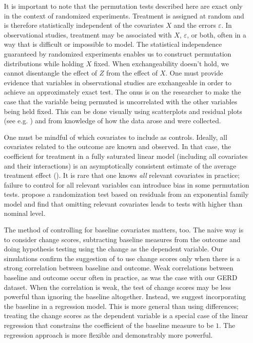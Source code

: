\documentclass[12pt]{article}
\begin{document}
It is important to note that the permutation tests described here are exact only in the context of randomized experiments.
Treatment is assigned at random and is therefore statistically independent of the covariates $X$ and the errors $\varepsilon$.
In observational studies, treatment may be associated with $X$, $\varepsilon$, or both, often in a way that is difficult or impossible to model.
The statistical independence guaranteed by randomized experiments enables us to construct permutation distributions while holding $X$ fixed.
When exchangeability doesn't hold, we cannot disentangle the effect of $Z$ from the effect of $X$.
One must provide evidence that variables in observational studies are exchangeable in order to achieve an approximately exact test.
The onus is on the researcher to make the case that the variable being permuted is uncorrelated with the other variables being held fixed.
This can be done visually using scatterplots and residual plots (see e.g. \cite{freedman_nonstochastic_1983}) and from knowledge of how the data arose and were collected.

One must be mindful of which covariates to include as controls.
Ideally, all covariates related to the outcome are known and observed.
In that case, the coefficient for treatment in a fully saturated linear model (including all covariates and their interactions) is an asymptotically consistent estimate of the average treatment effect (\cite{lin_agnostic_2013}).
It is rare that one knows \textit{all} relevant covariates in practice; failure to control for all relevant variables can introduce bias in some permutation tests.
 \cite{gail_tests_1988} propose a randomization test based on residuals from an exponential family model and find that omitting relevant covariates leads to tests with higher than nominal level.
 
The method of controlling for baseline covariates matters, too.
The naive way is to consider change scores, subtracting baseline measures from the outcome and doing hypothesis testing using the change as the dependent variable.
Our simulations confirm the suggestion of \cite{frison_repeated_1992} to use change scores only when there is a strong correlation between baseline and outcome.
Weak correlations between baseline and outcome occur often in practice, as was the case with our GERD dataset.
When the correlation is weak, the test of change scores may be less powerful than ignoring the baseline altogether.
Instead, we suggest incorporating the baseline in a regression model.
This is more general than using differences;
treating the change scores as the dependent variable is a special case of the linear regression that constrains the coefficient of the baseline measure to be $1$.
The regression approach is more flexible and demonstrably more powerful.
\end{document}
